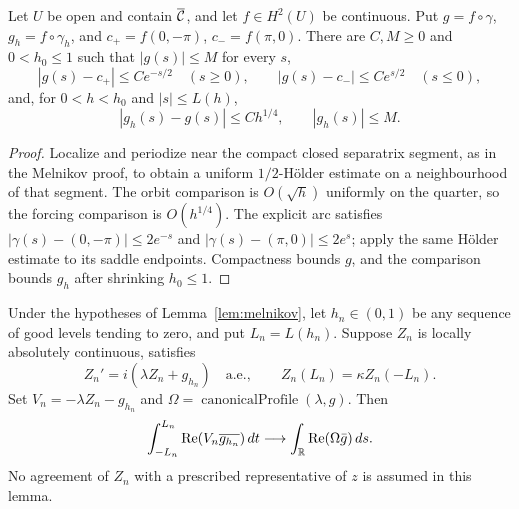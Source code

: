 \begin{lemma}
\label{lem:forcing-comparison}
\leanok
Let $U$ be open and contain $\overline{\mathcal{C}}$, and let $f\in H^2(U)$ be continuous.
Put $g=f\circ\gamma$, $g_h=f\circ\gamma_h$, and
$c_+=f(0,-\pi)$, $c_-=f(\pi,0)$. There are $C,M\ge0$ and $0<h_0\le1$ such that
$|g(s)|\le M$ for every $s$,
\[
 |g(s)-c_+|\le Ce^{-s/2}\quad(s\ge0),\qquad
 |g(s)-c_-|\le Ce^{s/2}\quad(s\le0),
\]
and, for $0<h<h_0$ and $|s|\le L(h)$,
\[
 |g_h(s)-g(s)|\le Ch^{1/4},\qquad |g_h(s)|\le M.
\]
\end{lemma}

\begin{proof}
\leanok
Localize and periodize near the compact closed separatrix segment, as in the
Melnikov proof, to obtain a uniform $1/2$-H\"older estimate on a neighbourhood
of that segment. The orbit comparison is $O(\sqrt h)$ uniformly on the quarter,
so the forcing comparison is $O(h^{1/4})$. The explicit arc satisfies
$|\gamma(s)-(0,-\pi)|\le2e^{-s}$ and
$|\gamma(s)-(\pi,0)|\le2e^s$; apply the same H\"older estimate to its saddle
endpoints. Compactness bounds $g$, and the comparison bounds $g_h$ after
shrinking $h_0\le1$.
\end{proof}

\begin{lemma}
\label{lem:quarter-pairing-limit}
\leanok
Under the hypotheses of Lemma~\ref{lem:melnikov}, let $h_n\in(0,1)$ be any
sequence of good levels tending to zero, and put $L_n=L(h_n)$.
Suppose $Z_n$ is locally absolutely continuous, satisfies
\[
 Z_n'=i(\lambda Z_n+g_{h_n})\quad\text{a.e.},\qquad
 Z_n(L_n)=\kappa Z_n(-L_n).
\]
Set $V_n=-\lambda Z_n-g_{h_n}$ and $\Omega=\operatorname{canonicalProfile}(\lambda,g)$.
Then
\[
 \int_{-L_n}^{L_n}\operatorname{Re}(V_n\overline{g_{h_n}})\,dt
 \longrightarrow\int_{\mathbb{R}}\operatorname{Re}(\Omega\bar g)\,ds.
\]
No agreement of $Z_n$ with a prescribed representative of $z$ is assumed in this lemma.
\end{lemma}

